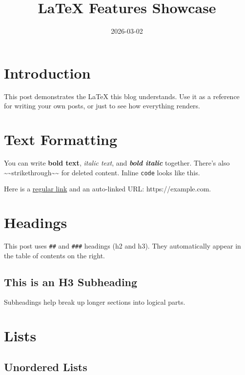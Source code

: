 \title{LaTeX Features Showcase}
\date{2026-03-02}



\section{Introduction}

This post demonstrates the LaTeX this blog understands. Use it as a reference for writing your own posts, or just to see how everything renders.

\section{Text Formatting}

You can write \textbf{bold text}, \emph{italic text}, and \emph{\textbf{bold italic}} together. There's also \textasciitilde{}\textasciitilde{}strikethrough\textasciitilde{}\textasciitilde{} for deleted content. Inline \texttt{code} looks like this.

Here is a \href{https://example.com}{regular link} and an auto-linked URL: https://example.com.

\section{Headings}

This post uses \texttt{\#\#} and \texttt{\#\#\#} headings (h2 and h3). They automatically appear in the table of contents on the right.

\subsection{This is an H3 Subheading}

Subheadings help break up longer sections into logical parts.

\section{Lists}

\subsection{Unordered Lists}

